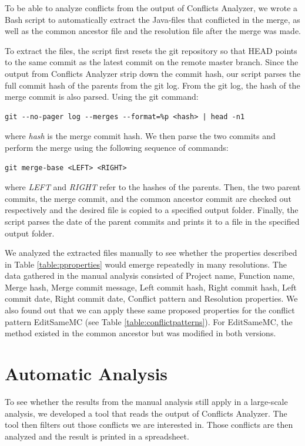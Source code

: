 To be able to analyze conflicts from the output of Conflicts Analyzer, we wrote a Bash script to automatically extract the Java-files that conflicted in the merge, as well as the common ancestor file and the resolution file after the merge was made.

To extract the files, the script first resets the git repository so that HEAD points to the same commit as the latest commit on the remote master branch. Since the output from Conflicts Analyzer strip down the commit hash, our script parses the full commit hash of the parents from the git log. From the git log, the hash of the merge commit is also parsed. Using the git command:
\lstset{language=Bash,numbers=left,xleftmargin=2em,frame=single,framexleftmargin=1.5em}
\begin{lstlisting}[frame=single,breaklines=true,tabsize=2]
git --no-pager log --merges --format=%p <hash> | head -n1
\end{lstlisting}
where \textit{hash} is the merge commit hash. We then parse the two commits and perform the merge using the following sequence of commands:\\
\lstset{language=Bash,numbers=left,xleftmargin=2em,frame=single,framexleftmargin=1.5em}
\begin{lstlisting}[frame=single,breaklines=true,tabsize=2]
git merge-base <LEFT> <RIGHT>
\end{lstlisting}
where \textit{LEFT} and \textit{RIGHT} refer to the hashes of the parents.  Then, the two parent commits, the merge commit, and the common ancestor commit are checked out respectively and the desired file is copied to a specified output folder. Finally, the script parses the date of the parent commits and prints it to a file in the specified output folder.

We analyzed the extracted files manually to see whether the properties described in Table \ref{table:pproperties} would emerge repeatedly in many resolutions. The data gathered in the manual analysis consisted of Project name, Function name, Merge hash, Merge commit message, Left commit hash, Right commit hash, Left commit date, Right commit date, Conflict pattern and Resolution properties. We also found out that we can apply these same proposed properties for the conflict pattern EditSameMC (see Table \ref{table:conflictpatterns}). For EditSameMC, the method existed in the common ancestor but was modified in both versions.
\FloatBarrier
\section{Automatic Analysis}
To see whether the results from the manual analysis still apply in a large-scale analysis, we developed a tool that reads the output of Conflicts Analyzer. The tool then filters out those conflicts we are interested in. Those conflicts are then analyzed and the result is printed in a spreadsheet.


